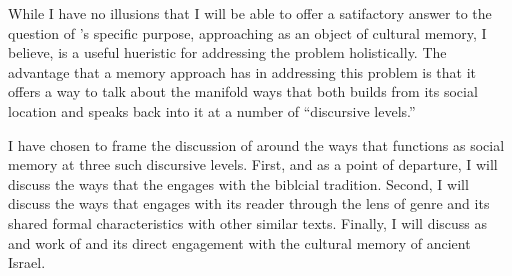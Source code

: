 While I have no illusions that I will be able to offer a satifactory answer to the question of \ga's specific purpose, approaching \ga as an object of cultural memory, I believe, is a useful hueristic for addressing the problem holistically. The advantage that a memory approach has in addressing this problem is that it offers a way to talk about the manifold ways that \ga both builds from its social location and speaks back into it at a number of ``discursive levels.''

I have chosen to frame the discussion of \ga around the ways that \ga functions as social memory at three such discursive levels. First, and as a point of departure, I will discuss the ways that the \ga engages with the biblcial tradition. Second, I will discuss the ways that \ga engages with its reader through the lens of genre and its shared formal characteristics with other similar texts. Finally, I will discuss \ga as and work of \psy and its direct engagement with the cultural memory of ancient Israel.

